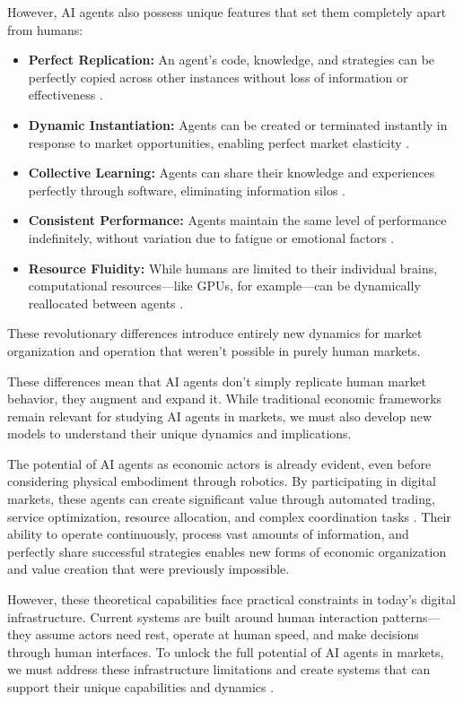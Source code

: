 \documentclass{article}
\begin{document}
However, AI agents also possess unique features that set them completely apart from humans:
\begin{itemize}
    \item \textbf{Perfect Replication:} An agent's code, knowledge, and strategies can be perfectly copied across other instances without loss of information or effectiveness \cite{nisan2007algorithmic}.
    \item \textbf{Dynamic Instantiation:} Agents can be created or terminated instantly in response to market opportunities, enabling perfect market elasticity \cite{nisan2007algorithmic}.
    \item \textbf{Collective Learning:} Agents can share their knowledge and experiences perfectly through software, eliminating information silos \cite{malone2022handbook}.
    \item \textbf{Consistent Performance:} Agents maintain the same level of performance indefinitely, without variation due to fatigue or emotional factors \cite{malone2022handbook}.
    \item \textbf{Resource Fluidity:} While humans are limited to their individual brains, computational resources—like GPUs, for example—can be dynamically reallocated between agents \cite{marinescu2022cloud}.
\end{itemize}

These revolutionary differences introduce entirely new dynamics for market organization and operation that weren't possible in purely human markets.

These differences mean that AI agents don't simply replicate human market behavior, they augment and expand it. While traditional economic frameworks remain relevant for studying AI agents in markets, we must also develop new models to understand their unique dynamics and implications.

The potential of AI agents as economic actors is already evident, even before considering physical embodiment through robotics. By participating in digital markets, these agents can create significant value through automated trading, service optimization, resource allocation, and complex coordination tasks \cite{lopez2018financial}. Their ability to operate continuously, process vast amounts of information, and perfectly share successful strategies enables new forms of economic organization and value creation that were previously impossible.

However, these theoretical capabilities face practical constraints in today's digital infrastructure. Current systems are built around human interaction patterns—they assume actors need rest, operate at human speed, and make decisions through human interfaces. To unlock the full potential of AI agents in markets, we must address these infrastructure limitations and create systems that can support their unique capabilities and dynamics \cite{brynjolfsson2011race, greenstein2019digital}.
\end{document}
